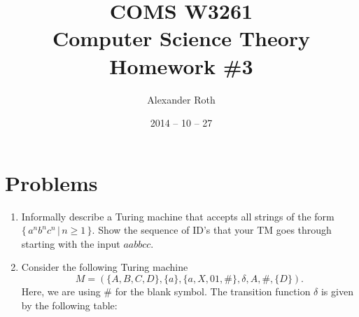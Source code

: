 \documentclass[]{article}
\begin{document}
\newtheorem{thm}{Theorem}
\title{COMS W3261 \\ Computer Science Theory \\ Homework \#3}
\author{Alexander Roth}
\date{2014 -- 10 -- 27}
\maketitle
\section*{Problems}
\begin{enumerate}
\item Informally describe a Turing machine that accepts all strings of the form
$\{\,a^nb^nc^n\,|\,n\geq1\,\}$. Show the sequence of ID's that your TM goes
through starting with the input $aabbcc$.
\item Consider the following Turing machine
\[ M = (\{A, B, C, D\}, \{a\}, \{a, X, 0 1, \#\}, \delta, A, \#, \{D\}).\]
Here, we are using \# for the blank symbol.
The transition function $\delta$ is given by the following table:


\end{enumerate}
\end{document}
